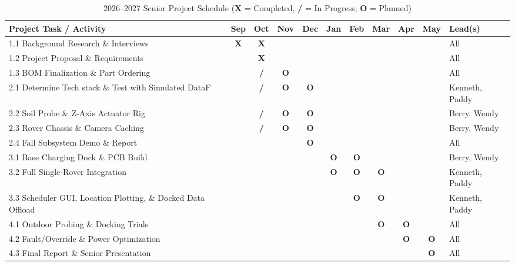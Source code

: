 \documentclass[12pt, letterpaper]{article}
\begin{document}
\begin{table}[htbp]
\centering
\footnotesize
\begin{tabularx}{\textwidth}{X | c c c c | c c c c c | l}
\toprule
\textbf{Project Task / Activity} & \textbf{Sep} & \textbf{Oct} & \textbf{Nov} & \textbf{Dec} & \textbf{Jan} & \textbf{Feb} & \textbf{Mar} & \textbf{Apr} & \textbf{May} & \textbf{Lead(s)} \\
\midrule
1.1 Background Research \& Interviews & \textbf{X} & \textbf{X} & & & & & & & & All \\
1.2 Project Proposal \& Requirements & & \textbf{X} & & & & & & & & All \\
1.3 BOM Finalization \& Part Ordering & & \textbf{/} & \textbf{O} & & & & & & & All \\
\midrule
2.1 Determine Tech stack \& Test with Simulated DataF & & \textbf{/} & \textbf{O} & \textbf{O} & & & & & & Kenneth, Paddy \\
2.2 Soil Probe \& Z-Axis Actuator Rig & & \textbf{/} & \textbf{O} & \textbf{O} & & & & & & Berry, Wendy \\
2.3 Rover Chassis \& Camera Caching & & \textbf{/} & \textbf{O} & \textbf{O} & & & & & & Berry, Wendy \\
2.4 Fall Subsystem Demo \& Report & & & & \textbf{O} & & & & & & All \\
\midrule
3.1 Base Charging Dock \& PCB Build & & & & & \textbf{O} & \textbf{O} & & & & Berry, Wendy \\
3.2 Full Single-Rover Integration & & & & & \textbf{O} & \textbf{O} & \textbf{O} & & & Kenneth, Paddy \\
3.3 Scheduler GUI, Location Plotting, \& Docked Data Offload & & & & & & \textbf{O} & \textbf{O} & & & Kenneth, Paddy \\
\midrule
4.1 Outdoor Probing \& Docking Trials & & & & & & & \textbf{O} & \textbf{O} & & All \\
4.2 Fault/Override \& Power Optimization & & & & & & & & \textbf{O} & \textbf{O} & All \\
4.3 Final Report \& Senior Presentation & & & & & & & & & \textbf{O} & All \\
\bottomrule
\end{tabularx}
\caption{2026--2027 Senior Project Schedule (\textbf{X} = Completed, \textbf{/} = In Progress, \textbf{O} = Planned)}
\label{tab:gantt}
\end{table}
\end{document}

